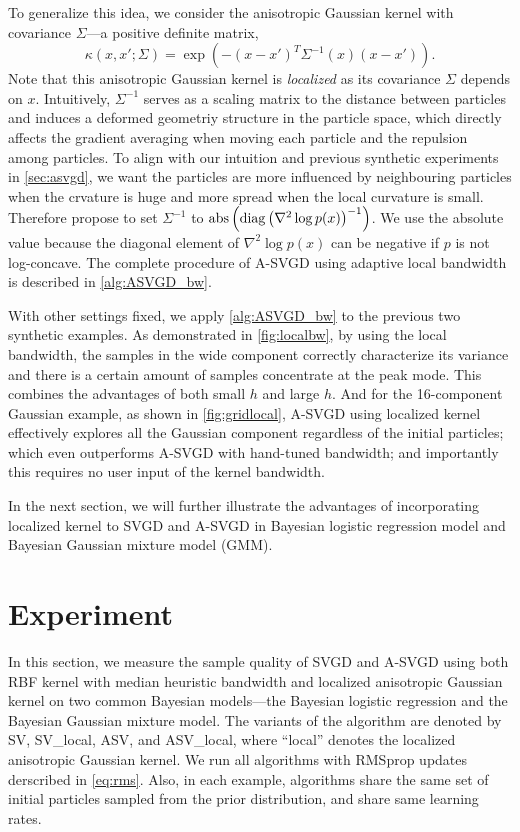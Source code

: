 To generalize this idea, we consider the anisotropic Gaussian kernel with covariance $\Sigma$---a positive definite matrix,
\[
\kappa(x, x'; \Sigma) = \exp(-(x - x')^T \Sigma^{-1}(x)(x- x')  ).  
\]
Note that this anisotropic Gaussian kernel is \emph{localized} as its covariance $\Sigma$ depends on $x$. 
Intuitively, $\Sigma^{-1}$ serves as a scaling matrix to the distance between particles and induces a deformed geometriy structure in the particle space, which directly affects the gradient averaging when moving each particle and the repulsion among particles.  To align with our intuition and previous synthetic experiments in \cref{sec:asvgd}, we want the particles are more influenced by neighbouring particles when the crvature is huge and more spread when the local curvature is small. Therefore propose to set $\Sigma^{-1}$ to $\text{abs}\left( \operatorname{diag} \left(\nabla^2 \log p(x) \right)^{-1}\right)$. We use the absolute value because the diagonal element of $\nabla^2 \log p(x)$ can be negative if $p$ is not log-concave. The complete procedure of A-SVGD
using adaptive local bandwidth is described in \cref{alg:ASVGD_bw}.




With other settings fixed, we apply \cref{alg:ASVGD_bw} to the previous two
synthetic examples. As demonstrated in \cref{fig:localbw}, by using the local
bandwidth, the samples in the wide component correctly characterize its
variance and there is a certain amount of samples concentrate at the peak
mode. This combines the advantages of both small $h$ and large $h$. And for
the 16-component Gaussian example, as shown in
\cref{fig:gridlocal}, A-SVGD using localized kernel effectively explores all
the Gaussian component regardless of the initial particles; which even
outperforms A-SVGD with hand-tuned bandwidth; and importantly this requires
no user input of the kernel bandwidth.


In the next section, we will further illustrate the advantages of incorporating
localized kernel to SVGD and A-SVGD in Bayesian logistic regression model
and Bayesian Gaussian mixture model (GMM). 


\section{Experiment} \label{sec:expt}

In this section, we measure the sample quality of SVGD and A-SVGD using both
RBF kernel with median heuristic bandwidth and localized anisotropic
Gaussian kernel on two common Bayesian models---the Bayesian logistic
regression and the Bayesian Gaussian mixture model. The variants of the algorithm are denoted by
SV, SV\_local, ASV, and ASV\_local, where ``local'' denotes the localized
anisotropic Gaussian kernel. We run all algorithms with RMSprop updates derscribed in \cref{eq:rms}. Also, in each example, algorithms share the same
set of initial particles sampled from the prior distribution, and share same learning rates.


